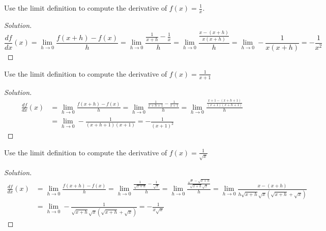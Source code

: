 \documentclass[crop=false,class=article,oneside]{standalone}
\begin{document}
            \begin{problem}
            Use the limit definition to compute the derivative of $f(x)=\frac{1}{x}$.
            \end{problem}
            \begin{proof}[Solution]
            \begin{equation*}
                \frac{df}{dx}(x)=\underset{h\rightarrow 0}{\lim}\frac{f(x+h)-f(x)}{h}=\underset{h\rightarrow 0}{\lim}\frac{\frac{1}{x+h}-\frac{1}{x}}{h}=\underset{h\rightarrow 0}{\lim}\frac{\frac{x-(x+h)}{x(x+h)}}{h}=\underset{h\rightarrow 0}{\lim}-\frac{1}{x(x+h)}=-\frac{1}{x^{2}}
            \end{equation*}
            \end{proof}
            \begin{problem}
            Use the limit definition to compute the derivative of $f(x)=\frac{1}{x+1}$
            \end{problem}
            \begin{proof}[Solution]
            \begin{align*}
                \frac{df}{dx}(x)&=\underset{h\rightarrow 0}{\lim}\frac{f(x+h)-f(x)}{h}=\underset{h\rightarrow 0}{\lim}\frac{\frac{1}{x+h+1}-\frac{1}{x+1}}{h}=\underset{h\rightarrow 0}{\lim}\frac{\frac{x+1-(x+h+1)}{(x+1)(x+h+1)}}{h}\\
                &=\underset{h\rightarrow 0}{\lim}-\frac{1}{(x+h+1)(x+1)}=-\frac{1}{(x+1)^{2}}
            \end{align*}
            \end{proof}
            \begin{problem}
            Use the limit definition to compute the derivative of $f(x)=\frac{1}{\sqrt{x}}$
            \end{problem}
            \begin{proof}[Solution]
            \begin{align*}
                \frac{df}{dx}(x)&=\underset{h\rightarrow 0}{\lim}\frac{f(x+h)-f(x)}{h}=\underset{h\rightarrow 0}{\lim}\frac{\frac{1}{\sqrt{x+h}}-\frac{1}{\sqrt{x}}}{h}=\underset{h\rightarrow 0}{\lim}\frac{\frac{\sqrt{x}-\sqrt{x+h}}{\sqrt{x+h}\sqrt{x}}}{h}=\underset{h\rightarrow 0}{\lim}\frac{x-(x+h)}{h\sqrt{x+h}\sqrt{x}(\sqrt{x+h}+\sqrt{x})}\\
                &=\underset{h\rightarrow 0}{\lim}-\frac{1}{\sqrt{x+h}\sqrt{x}(\sqrt{x+h}+\sqrt{x})}=-\frac{1}{x\sqrt{x}}
            \end{align*}
            \end{proof}
\end{document}
